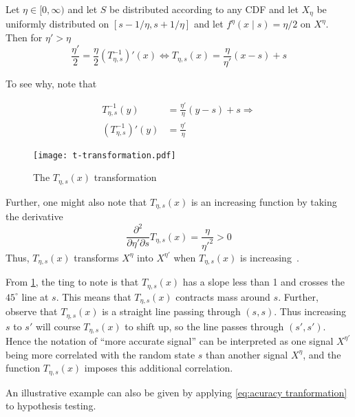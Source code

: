 \begin{example}\label{ex:t-transformation-1}
Let  $\eta\in[0,\infty)$ and let $S$ be distributed according to any CDF and let $X_{\eta}$ be uniformly distributed on $[s-1/\eta,s+1/\eta]$ and let $f^\eta(x\mid s)=\eta\big /2$ on $X^\eta$. Then for $\eta'>\eta$
\[
	\frac{\eta'}{2}=\frac{\eta}{2}\left(T_{\eta,s}^{-1}\right)'(x)\Leftrightarrow T_{\eta,s}(x)=\frac{\eta}{\eta'}(x-s)+s
\]

To see why, note that

\begin{align*}
	T^{-1}_{\eta,s}(y)               &=\frac{\eta'}{\eta}(y-s)+s \Rightarrow \\
	\left(T^{-1}_{\eta,s}\right)'(y) &=\frac{\eta'}{\eta}
\end{align*}

\begin{figure}
	\texttt{[image: t-transformation.pdf]}
	\caption{\label{fig:t-transformation}The $T_{\eta,s}(x)$ transformation}
\end{figure}

Further, one might also note that $T_{\eta,s}(x)$ is an increasing function by taking the derivative
\[
	\frac{\partial^2}{\partial \eta'\partial s}T_{\eta,s}(x)=\frac{\eta}{\eta'^2}>0
\]
Thus, $T_{\eta,s}(x)$ transforms $X^{\eta}$ into $X^{\eta'}$ when $T_{\eta,s}(x)$ is increasing~\citep{Persico1996Information}.

From \cref{fig:t-transformation}, the ting to note is that $T_{\eta,s}(x)$ has a slope less than 1 and crosses the $45^\circ$ line at $s$. This means that $T_{\eta,s}(x)$ contracts mass around $s$. Further, observe that $T_{\eta,s}(x)$ is a straight line passing through $(s,s)$. Thus increasing $s$ to $s'$ will course $T_{\eta,s}(x)$ to shift up, so the line passes through $(s',s')$. Hence the notation of ``more accurate signal'' can be interpreted as one signal $X^{\eta'}$ being more correlated with the random state $s$ than another signal $X^\eta$, and the function $T_{\eta,s}(x)$ imposes this additional correlation.
\end{example}

An illustrative example can also be given by applying \cref{eq:acuracy tranformation} to hypothesis testing.

